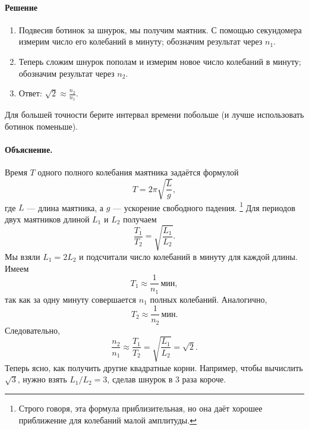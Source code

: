\paragraph{Решение}

\begin{enumerate}
\item Подвесив ботинок за шнурок, мы получим маятник.
С помощью секундомера измерим число его колебаний в минуту;
обозначим результат через $n_1$.

\item Теперь сложим шнурок пополам и измерим новое число колебаний в минуту; обозначим результат через $n_{2}$.

\item Ответ: $\sqrt{2} \approx \frac{n_{2}}{n_{1}}$.
\end{enumerate}
Для большей точности берите интервал времени побольше
(и лучше использовать ботинок поменьше).

\paragraph{Объяснение.}
Время $T$ одного полного колебания маятника задаётся формулой
\[
T=2\pi \sqrt{\frac{L}{g}},
\]
где $L$ --- длина маятника, а $g$ --- ускорение свободного падения.%
\footnote{Строго говоря, эта формула приблизительная, но она даёт хорошее приближение для колебаний малой амплитуды.}
Для периодов двух маятников длиной $L_{1}$ и $L_{2}$ получаем
\[
\frac{T_{1}}{T_{2}}=\sqrt{\frac{L_{1}}{L_{2}}}.
\]
Мы взяли $L_{1}=2L_{2}$ и подсчитали число колебаний в минуту для каждой длины.
Имеем
\[
T_{1} \approx \frac{1}{n_{1}}\,\text{мин},
\]
так как за одну минуту совершается $n_{1}$ полных колебаний. Аналогично,
\[
T_{2} \approx \frac{1}{n_{2}}\,\text{мин}.
\]
Следовательно,
\[
\frac{n_{2}}{n_{1}}
\approx
\frac{T_{1}}{T_{2}}
=
\sqrt{\frac{L_{1}}{L_{2}}}
=\sqrt{2}.
\]
Теперь ясно, как получить другие квадратные корни.
Например, чтобы вычислить $\sqrt{3}$, нужно взять $L_{1}/L_{2}=3$, сделав шнурок в 3 раза короче.

